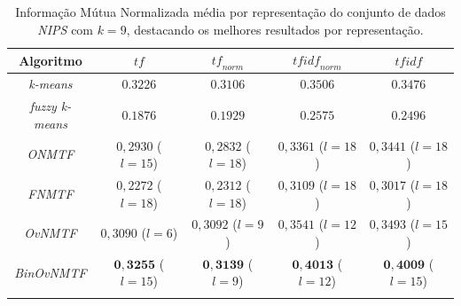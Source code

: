 \documentclass[
    12pt,                %
    oneside,            %
    a4paper,            %
    english,            %
    brazil                %
    ]{abntex2ppgsi}
\begin{document}
\begin{table}[H]
\centering
    \caption{Informação Mútua Normalizada média por representação do conjunto de dados \textit{NIPS} com $k = 9$, destacando os melhores resultados por representação.}
    \begin{tabular}{ccccc}
        \hline
        Algoritmo              & $\textit{tf}$ & $\textit{tf}_{norm}$ & $\textit{tfidf}_{norm}$ & $\textit{tfidf}$ \\
        \hline
        \textit{k-means}       & $0.3226$            & $0.3106$            & $0.3506$            & $0.3476$ \\
        \textit{fuzzy k-means} & $0.1876$            & $0.1929$            & $0.2575$            & $0.2496$ \\
        \textit{ONMTF}         & $0,2930$ ($l = 15$) & $0,2832$ ($l = 18$) & $0,3361$ ($l = 18$) & $0,3441$ ($l = 18$) \\
        \textit{FNMTF}         & $0,2272$ ($l = 18$) & $0,2312$ ($l = 18$) & $0,3109$ ($l = 18$) & $0,3017$ ($l = 18$) \\
        \textit{OvNMTF}        & $0,3090$ ($l = 6$)  & $0,3092$ ($l = 9$)  & $0,3541$ ($l = 12$) & $0,3493$ ($l = 15$) \\
        \textit{BinOvNMTF}     & $\mathbf{0,3255}$ ($l = 15$) & $\mathbf{0,3139}$ ($l = 9$)  & $\mathbf{0,4013}$ ($l = 12$) & $\mathbf{0,4009}$ ($l = 15$) \\
        \hline \\
    \end{tabular}
    \label{tab:experiments-quant-nmi:nips}
\end{table}
\end{document}
